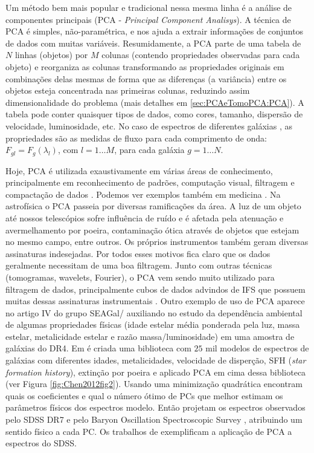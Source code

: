 Um método bem mais popular e tradicional nessa mesma linha é a análise de componentes principais (PCA - {\em Principal
Component Analisys}). A técnica de PCA é simples, não-paramétrica, e nos ajuda a extrair informações de conjuntos de
dados com muitas variáveis. Resumidamente, a PCA parte de uma tabela de $N$ linhas (objetos) por $M$ colunas (contendo
propriedades observadas para cada objeto) e reorganiza as colunas transformando as propriedades originais em combinações
delas mesmas de forma que as diferenças (a variância) entre os objetos  esteja concentrada nas primeiras colunas,
reduzindo assim dimensionalidade do problema (mais detalhes em \ref{sec:PCAeTomoPCA:PCA}). A tabela pode conter
quaisquer tipos de dados, como cores, tamanho, dispersão de velocidade, luminosidade, etc. No caso de espectros de
diferentes galáxias \citep[e.g., ][]{Francis1992, Sodre1994, Sodre1997}, as propriedades são as medidas de fluxo para
cada comprimento de onda: $F_{gl} = F_g(\lambda_l)$, com $l = 1 \ldots M$, para cada galáxia $g = 1 \ldots N$.

Hoje, PCA é utilizada exaustivamente em várias áreas de conhecimento, principalmente em reconhecimento de padrões,
computação visual, filtragem e compactação de dados \citep{Kamruzzaman2010, Borcea2012}. Podemos ver exemplos também em
medicina \citep{Balakrishnan2013}. Na astrofísica o PCA passeia por diversas ramificações da área. A luz de um objeto
até nossos telescópios sofre influência de ruído e é afetada pela atenuação e avermelhamento por poeira, contaminação
ótica através de objetos que estejam no mesmo campo, entre outros. Os próprios instrumentos também geram diversas
assinaturas indesejadas. Por todos esses motivos fica claro que os dados geralmente necessitam de uma boa filtragem.
Junto com outras técnicas (tomogramas, wavelets, Fourier), o PCA vem sendo muito utilizado para filtragem de dados,
principalmente cubos de dados advindos de IFS que possuem muitas dessas assinaturas instrumentais \citep{Riffel2011}.
Outro exemplo de uso de PCA aparece no artigo IV do grupo SEAGal/\starlight \citep{Mateus2007} auxiliando no estudo da
dependência ambiental de algumas propriedades físicas (idade estelar média ponderada pela luz, massa estelar,
metalicidade estelar e razão massa/luminosidade) em uma amostra de galáxias do \SDSS DR4. Em \citet{Chen2012} é criada
uma biblioteca com $25$ mil modelos de espectros de galáxias com diferentes idades, metalicidades, velocidade de
disperção, SFH ({\em star formation history}), extinção por poeira e aplicado PCA em cima dessa biblioteca (ver Figura
\ref{fig:Chen2012fig2}). Usando uma minimização quadrática encontram quais os coeficientes e qual o número ótimo de PCs
que melhor estimam os parâmetros físicos dos espectros modelo. Então projetam os espectros observados pelo SDSS DR7
\citep{Abazajian2009} e pelo Baryon Oscillation Spectroscopic Survey \citep[BOSS][]{Ahn2012}, atribuindo um sentido
físico a cada PC. Os trabalhos de \citet{Ferreras2006, Wild2006, Rogers1997} exemplificam a aplicação de PCA a espectros
do SDSS.

